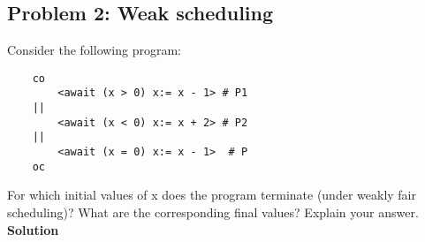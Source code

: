 \subsection{Problem 2: Weak scheduling}

Consider the following program:

\begin{lstlisting}
    co
        <await (x > 0) x:= x - 1> # P1
    ||
        <await (x < 0) x:= x + 2> # P2
    ||
        <await (x = 0) x:= x - 1>  # P
    oc
\end{lstlisting}


For which initial values of x does the program terminate (under weakly fair scheduling)?
What are the corresponding final values? Explain your answer. \\

\textbf{Solution}


